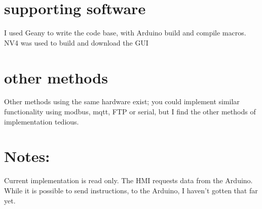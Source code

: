 \documentclass[]{article}
\begin{document}
	\section*{supporting software}
	I used Geany to write the code base, with Arduino build and compile macros. 
	NV4 was used to build and download the GUI
	\section*{other methods}
	Other methods using the same hardware exist; you could implement similar functionality using modbus, mqtt,  FTP or serial, but I find the other methods of implementation tedious. 
	\section*{Notes:}
	Current implementation is read only. The HMI requests data from the Arduino.
	While it is possible to send instructions, to the Arduino, I haven't gotten that far yet.
	
	\section*{}
	\section*{}
	
\end{document}
